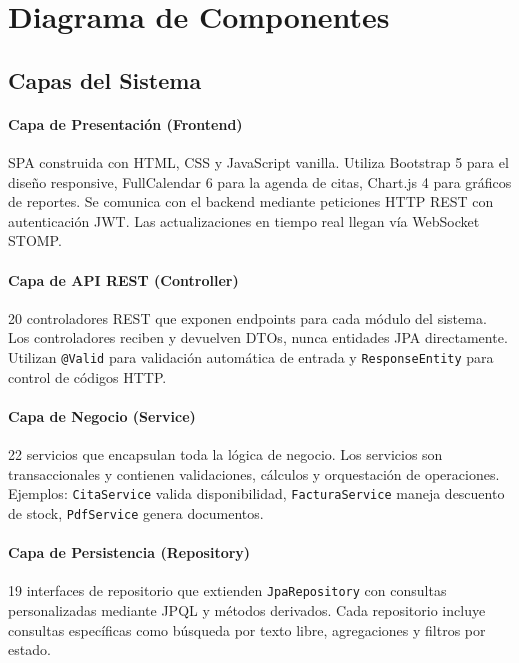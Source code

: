 \section{Diagrama de Componentes}

\subsection{Capas del Sistema}

\paragraph{Capa de Presentaci\'on (Frontend)}
SPA construida con HTML, CSS y JavaScript vanilla. Utiliza Bootstrap 5 para el dise\~no responsive, FullCalendar 6 para la agenda de citas, Chart.js 4 para gr\'aficos de reportes. Se comunica con el backend mediante peticiones HTTP REST con autenticaci\'on JWT. Las actualizaciones en tiempo real llegan v\'ia WebSocket STOMP.

\paragraph{Capa de API REST (Controller)}
20 controladores REST que exponen endpoints para cada m\'odulo del sistema. Los controladores reciben y devuelven DTOs, nunca entidades JPA directamente. Utilizan \texttt{@Valid} para validaci\'on autom\'atica de entrada y \texttt{ResponseEntity} para control de c\'odigos HTTP.

\paragraph{Capa de Negocio (Service)}
22 servicios que encapsulan toda la l\'ogica de negocio. Los servicios son transaccionales y contienen validaciones, c\'alculos y orquestaci\'on de operaciones. Ejemplos: \texttt{CitaService} valida disponibilidad, \texttt{FacturaService} maneja descuento de stock, \texttt{PdfService} genera documentos.

\paragraph{Capa de Persistencia (Repository)}
19 interfaces de repositorio que extienden \texttt{JpaRepository} con consultas personalizadas mediante JPQL y m\'etodos derivados. Cada repositorio incluye consultas espec\'ificas como b\'usqueda por texto libre, agregaciones y filtros por estado.

